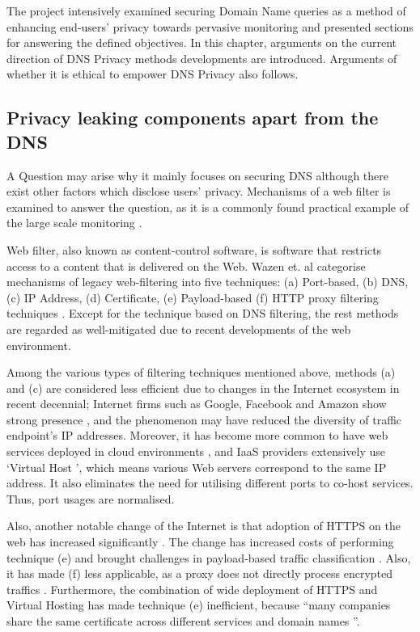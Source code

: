 The project intensively examined securing Domain Name queries as a method of enhancing end-users' privacy towards pervasive monitoring and presented sections for answering the defined objectives. In this chapter, arguments on the current direction of DNS Privacy methods developments are introduced. Arguments of whether it is ethical to empower DNS Privacy also follows.

\subsection{Privacy leaking components apart from the DNS}
A Question may arise why it mainly focuses on securing DNS although there exist other factors which disclose users' privacy.
Mechanisms of a web filter is examined to answer the question, as it is a commonly found practical example of the large scale monitoring \cite{murdoch2008tools}.

Web filter, also known as content-control software, is software that restricts access to a content that is delivered on the Web.
Wazen et. al categorise mechanisms of legacy web-filtering into five techniques: (a) Port-based, (b) DNS, (c) IP Address, (d) Certificate, (e) Payload-based (f) HTTP proxy filtering techniques \cite{shbair2015efficiently}.
Except for the technique based on DNS filtering, the rest methods are regarded as well-mitigated due to recent developments of the web environment. 

Among the various types of filtering techniques mentioned above, methods (a) and (c) are considered less efficient due to changes in the Internet ecosystem in recent decennial;
Internet firms such as Google, Facebook and Amazon show strong presence \cite{haucap2014google}, and the phenomenon may have reduced the diversity of traffic endpoint's IP addresses.
Moreover, it has become more common to have web services deployed in cloud environments \cite{clouds2018stat}, and IaaS providers extensively use `Virtual Host \cite{virtual24host}', which means various Web servers correspond to the same IP address.
It also eliminates the need for utilising different ports to co-host services. Thus, port usages are normalised.

Also, another notable change of the Internet is that adoption of HTTPS on the web has increased significantly \cite{felt2017measuring}.
The change has increased costs of performing technique (e) and brought challenges in payload-based traffic classification \cite{xue2013traffic}.
Also, it has made (f) less applicable, as a proxy does not directly process encrypted traffics \cite{shbair2015efficiently}.
Furthermore, the combination of wide deployment of HTTPS and Virtual Hosting has made technique (e) inefficient, because ``many companies share the same certificate across different services and domain names \cite{shbair2015efficiently}''.

